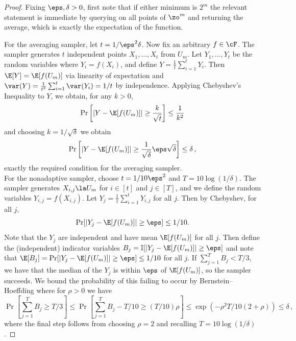 \documentclass{toc}
\begin{document}
\begin{proof}
Fixing $\eps,\delta>0$, first note that if either minimum is $2^m$ the relevant statement is immediate by querying on all points of $\zo^m$ and returning the average, which is exactly the expectation of the function.

For the averaging sampler, let $t=1/\eps^2\delta$. Now fix an arbitrary $f\in \cF$. The sampler generates $t$ independent points $X_1,\ldots,X_t$ from $U_m$. Let $Y_1,\ldots,Y_t$ be the random variables where $Y_i=f(X_i)$, and define $Y=\frac{1}{t}\sum_{i=1}^tY_i$. Then $\E[Y]=\E[f(U_m)]$ via linearity of expectation and $\var(Y)=\frac{1}{t^2}\sum_{i=1}^t\var(Y_i)=1/t$ by independence. Applying Chebyshev's Inequality to $Y$, we %
obtain, %
for any $k>0$,
\[\Pr\left[|Y-\E[f(U_m)]| \geq \frac{k}{\sqrt{t}}\right] \leq \frac{1}{k^2}\]
and choosing $k=1/\sqrt{\delta}$ we obtain
\[\Pr\left[|Y-\E[f(U_m)]| \geq \frac{1}{\sqrt{\delta}}\eps\sqrt{\delta}\right] \leq \delta\,,%
\]
%
exactly the required condition for the averaging sampler.\\

For the nonadaptive sampler, choose $t=1/10\eps^2$ and $T=10\log(1/\delta)$. The sampler generates $X_{i,j}\la U_m$ for $i\in[t]$ and $j\in[T]$, and we %
define the random variables $Y_{i,j}=f(X_{i,j})$. Let $Y_j=\frac{1}{t}\sum_{i=1}^tY_{i,j}$ for all $j$. Then by Chebyshev, for all $j$,
\[\Pr[|Y_j-\E[f(U_m)]| \geq \eps] \leq 1/10.\]
Note that the $Y_j$ are independent and have mean $\E[f(U_m)]$ for all $j$. Then define the (independent) indicator variables $B_j=\mathbb{I}[|Y_j-\E[f(U_m)]|\geq \eps]$ and note that $\E[B_j]=\Pr[|Y_j-\E[f(U_m)]|\geq \eps]\leq 1/10$ for all $j$. If $\sum_{j=1}^TB_j<T/3$, we have that the median of the %
$Y_j$  %
is within $\eps$ of $\E[f(U_m)]$, so the sampler succeeds. We bound the probability of this
failing 
to occur by 
%
Bernstein--Hoeffding
%
%
%
%
%
where for $\rho>0$ we have %
\[\Pr\left[\sum_{j=1}^TB_j\geq T/3\right]\leq \Pr\left[\sum_{j=1}^TB_j - T/10 \geq (T/10)\rho\right] \leq \exp(-\rho^2T/10(2+\rho))\leq \delta\,,\] %
%
where  %
the final step follows from choosing $\rho=2$ and recalling $T=10\log(1/\delta)$.
\end{proof}
\end{document}
